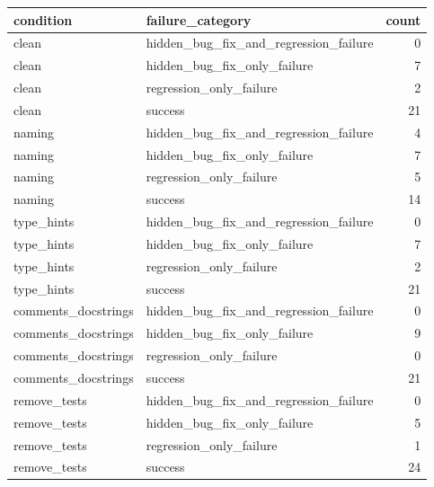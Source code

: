 \begin{tabular}{llr}
\toprule
condition & failure\_category & count \\
\midrule
clean & hidden\_bug\_fix\_and\_regression\_failure & 0 \\
clean & hidden\_bug\_fix\_only\_failure & 7 \\
clean & regression\_only\_failure & 2 \\
clean & success & 21 \\
naming & hidden\_bug\_fix\_and\_regression\_failure & 4 \\
naming & hidden\_bug\_fix\_only\_failure & 7 \\
naming & regression\_only\_failure & 5 \\
naming & success & 14 \\
type\_hints & hidden\_bug\_fix\_and\_regression\_failure & 0 \\
type\_hints & hidden\_bug\_fix\_only\_failure & 7 \\
type\_hints & regression\_only\_failure & 2 \\
type\_hints & success & 21 \\
comments\_docstrings & hidden\_bug\_fix\_and\_regression\_failure & 0 \\
comments\_docstrings & hidden\_bug\_fix\_only\_failure & 9 \\
comments\_docstrings & regression\_only\_failure & 0 \\
comments\_docstrings & success & 21 \\
remove\_tests & hidden\_bug\_fix\_and\_regression\_failure & 0 \\
remove\_tests & hidden\_bug\_fix\_only\_failure & 5 \\
remove\_tests & regression\_only\_failure & 1 \\
remove\_tests & success & 24 \\
\bottomrule
\end{tabular}

